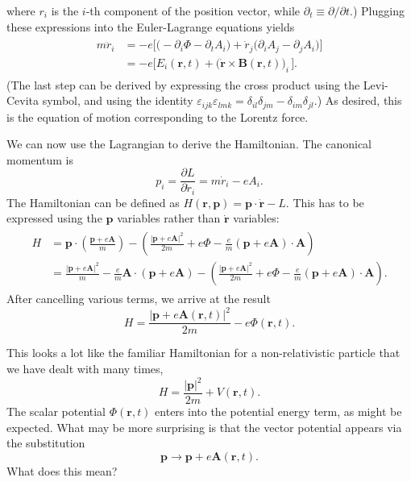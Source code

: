 \documentclass[pra,12pt]{revtex4}
\begin{document}
where $r_i$ is the $i$-th component of the position vector, while
$\partial_t \equiv \partial/\partial t$.)  Plugging these expressions
into the Euler-Lagrange equations yields
\begin{align}
  \begin{aligned}
    m\ddot{r}_i &=
    -e\Big[\Big(-\partial_i \Phi - \partial_t A_i\Big)
      + \dot{r}_j \Big( \partial_i A_j - \partial_j A_i\Big) \Big] \\
    &= -e \Big[E_i(\mathbf{r},t) + \big(\dot{\mathbf{r}} \times
      \mathbf{B}(\mathbf{r},t) \big)_i\, \Big].
  \end{aligned}
\end{align}
(The last step can be derived by expressing the cross product using
the Levi-Cevita symbol, and using the identity $\varepsilon_{ijk}
\varepsilon_{lmk} = \delta_{il} \delta_{jm} - \delta_{im}
\delta_{jl}$.)  As desired, this is the equation of motion
corresponding to the Lorentz force.

We can now use the Lagrangian to derive the Hamiltonian.  The
canonical momentum is
\begin{equation}
  p_i = \frac{\partial L}{\partial \dot{r}_i} = m\dot{r}_i - e A_i.
\end{equation}
The Hamiltonian can be defined as $H(\mathbf{r},\mathbf{p}) =
\mathbf{p} \cdot \dot{\mathbf{r}} - L$.  This has to be expressed
using the $\mathbf{p}$ variables rather than $\dot{\mathbf{r}}$
variables:
\begin{align}
  \begin{aligned}
    H &= \mathbf{p}\cdot \left(\frac{\mathbf{p}+e\mathbf{A}}{m}\right)
    - \left(\frac{|\mathbf{p}+e\mathbf{A}|^2}{2m}
    + e\Phi - \frac{e}{m}(\mathbf{p}+e\mathbf{A})\cdot \mathbf{A}\right) \\
    &= \frac{|\mathbf{p}+e\mathbf{A}|^2}{m}
    - \frac{e}{m}\mathbf{A}\cdot \left(\mathbf{p}+e\mathbf{A}\right)
    - \left(\frac{|\mathbf{p}+e\mathbf{A}|^2}{2m}
    + e\Phi - \frac{e}{m}(\mathbf{p}+e\mathbf{A})\cdot \mathbf{A}\right).
  \end{aligned}
\end{align}
After cancelling various terms, we arrive at the result
\begin{equation}
H = \frac{|\mathbf{p}+e\mathbf{A}(\mathbf{r},t)|^2}{2m} - e\Phi(\mathbf{r},t).
\end{equation}

This looks a lot like the familiar Hamiltonian for a non-relativistic
particle that we have dealt with many times,
\begin{equation}
  H = \frac{|\mathbf{p}|^2}{2m} + V(\mathbf{r},t).
\end{equation}
The scalar potential $\Phi(\mathbf{r},t)$ enters into the potential
energy term, as might be expected.  What may be more surprising is
that the vector potential appears via the substitution
\begin{equation}
  \mathbf{p} \rightarrow \mathbf{p} + e\mathbf{A}(\mathbf{r},t).  
\end{equation}
What does this mean?
\end{document}
